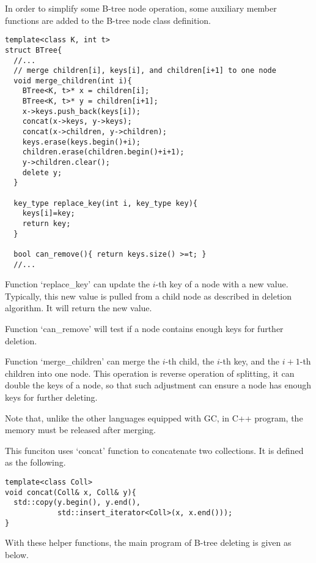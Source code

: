 \documentclass{article}
\begin{document}
In order to simplify some B-tree node operation, some auxiliary 
member functions are added to the B-tree node class definition.

\lstset{language=C++}
\begin{lstlisting}
template<class K, int t>
struct BTree{
  //...
  // merge children[i], keys[i], and children[i+1] to one node
  void merge_children(int i){
    BTree<K, t>* x = children[i];
    BTree<K, t>* y = children[i+1];
    x->keys.push_back(keys[i]);
    concat(x->keys, y->keys);
    concat(x->children, y->children);
    keys.erase(keys.begin()+i);
    children.erase(children.begin()+i+1);
    y->children.clear();
    delete y;
  }

  key_type replace_key(int i, key_type key){
    keys[i]=key;
    return key;
  }

  bool can_remove(){ return keys.size() >=t; }
  //...
\end{lstlisting}

Function `replace\_key' can update the $i$-th key of a node with a
new value. Typically, this new value is pulled from a child node as
described in deletion algorithm. It will return the new value.

Function `can\_remove' will test if a node contains enough keys for
further deletion.

Function `merge\_children' can merge the $i$-th child, the $i$-th key,
and the $i+1$-th children into one node. This operation is reverse
operation of splitting, it can double the keys of a node, so that
such adjustment can ensure a node has enough keys for further deleting.

Note that, unlike the other languages equipped with GC, in C++ program,
the memory must be released after merging.

This funciton uses `concat' function to concatenate two collections.
It is defined as the following.

\begin{lstlisting}
template<class Coll>
void concat(Coll& x, Coll& y){
  std::copy(y.begin(), y.end(), 
            std::insert_iterator<Coll>(x, x.end()));
}
\end{lstlisting}

With these helper functions, the main program of B-tree deleting
is given as below.
\end{document}
